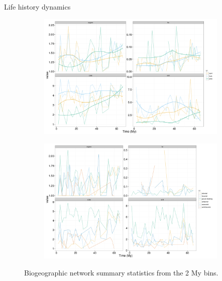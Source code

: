 \documentclass[final]{beamer}\usepackage[]{graphicx}\usepackage[]{color}
\newlength{\onecolwid}
\newlength{\twocolwid}
\begin{document}
\begin{frame}[t]
\begin{columns}[t]
\begin{column}{\twocolwid}
      \begin{alertblock}{Life history dynamics}
        \begin{figure}[ht]
          \begin{center}
            \begin{subfigure}[b]{\onecolwid}
              \centering
              \includegraphics[width = 0.8\onecolwid]{figure/diet_bin}
              \label{fig:net_diet}
            \end{subfigure}
            \begin{subfigure}[b]{\onecolwid}
              \centering
              \includegraphics[width = 0.8\onecolwid]{figure/loco_bin}
              \label{fig:net_loco}
            \end{subfigure}
          \end{center}
          \caption{Biogeographic network summary statistics from the 2 My bins.}
          \label{fig:net_sum}
        \end{figure}
      \end{alertblock}


\end{column}
\end{columns}
\end{frame}
\end{document}
